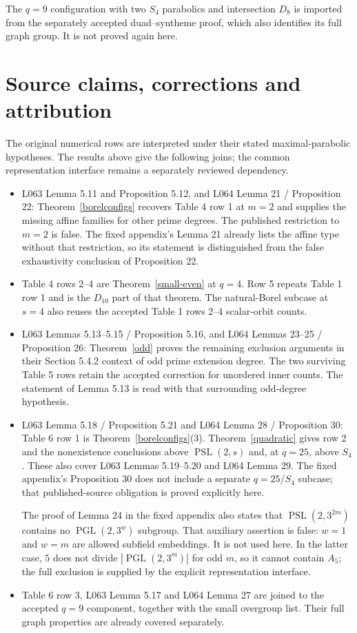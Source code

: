 \documentclass[11pt]{article}
\newcommand{\PSL}{\operatorname{PSL}}\newcommand{\PGL}{\operatorname{PGL}}
\begin{document}
The $q=9$ configuration with two $S_4$ parabolics and intersection
$D_8$ is imported from the separately accepted duad--syntheme proof,
which also identifies its full graph group. It is not proved again here.

\section{Source claims, corrections and attribution}
The original numerical rows are interpreted under their stated
maximal-parabolic hypotheses. The results above give the following
joins; the common representation interface remains a separately
reviewed dependency.
\begin{itemize}
\item L063 Lemma 5.11 and Proposition 5.12, and L064 Lemma 21 /
Proposition 22: Theorem~\ref{borelconfigs} recovers Table 4 row 1
at $m=2$ and supplies the missing affine families for other prime
degrees. The published restriction to $m=2$ is false. The fixed
appendix's Lemma 21 already lists the affine type without that
restriction, so its statement is distinguished from the false
exhaustivity conclusion of Proposition 22.
\item Table 4 rows 2--4 are Theorem~\ref{small-even} at $q=4$.
Row 5 repeats Table 1 row 1 and is the $D_{10}$ part of that theorem.
The natural-Borel subcase at $s=4$ also reuses the accepted Table 1
rows 2--4 scalar-orbit counts.
\item L063 Lemmas 5.13--5.15 / Proposition 5.16, and L064
Lemmas 23--25 / Proposition 26: Theorem~\ref{odd} proves the
remaining exclusion arguments in their Section 5.4.2 context of
odd prime extension degree. The two surviving Table 5 rows retain
the accepted correction for unordered inner counts. The statement
of Lemma 5.13 is read with that surrounding odd-degree hypothesis.
\item L063 Lemma 5.18 / Proposition 5.21 and L064 Lemma 28 /
Proposition 30: Table 6 row 1 is Theorem~\ref{borelconfigs}(3).
Theorem~\ref{quadratic} gives row 2 and the nonexistence conclusions
above $\PSL(2,s)$ and, at $q=25$, above $S_4$. These also cover
L063 Lemmas 5.19--5.20 and L064 Lemma 29. The fixed appendix's
Proposition 30 does not include a separate $q=25$/$S_4$ subcase;
that published-source obligation is proved explicitly here.

The proof of Lemma 24 in the fixed appendix also states that
$\PSL(2,3^{2m})$ contains no $\PGL(2,3^w)$ subgroup.
That auxiliary assertion is false: $w=1$ and $w=m$ are allowed
subfield embeddings. It is not used here. In the latter case,
$5$ does not divide $|\PGL(2,3^m)|$ for odd $m$, so it cannot
contain $A_5$; the full exclusion is supplied by the explicit
representation interface.
\item Table 6 row 3, L063 Lemma 5.17 and L064 Lemma 27 are joined
to the accepted $q=9$ component, together with the small overgroup
list. Their full graph properties are already covered separately.
\end{itemize}
\end{document}
